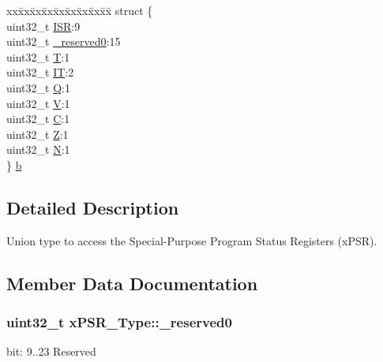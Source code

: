 \begin{DoxyCompactItemize}
\begin{tabbing}
\end{tabbing}\item 
\begin{tabbing}
xx\=xx\=xx\=xx\=xx\=xx\=xx\=xx\=xx\=\kill
struct \{\\
\>uint32\_t \hyperlink{unionxPSR__Type_a3e9120dcf1a829fc8d2302b4d0673970}{ISR}:9\\
\>uint32\_t \hyperlink{unionxPSR__Type_af438e0f407357e914a70b5bd4d6a97c5}{\_reserved0}:15\\
\>uint32\_t \hyperlink{unionxPSR__Type_a7eed9fe24ae8d354cd76ae1c1110a658}{T}:1\\
\>uint32\_t \hyperlink{unionxPSR__Type_a3200966922a194d84425e2807a7f1328}{IT}:2\\
\>uint32\_t \hyperlink{unionxPSR__Type_add7cbd2b0abd8954d62cd7831796ac7c}{Q}:1\\
\>uint32\_t \hyperlink{unionxPSR__Type_af14df16ea0690070c45b95f2116b7a0a}{V}:1\\
\>uint32\_t \hyperlink{unionxPSR__Type_a40213a6b5620410cac83b0d89564609d}{C}:1\\
\>uint32\_t \hyperlink{unionxPSR__Type_a1e5d9801013d5146f2e02d9b7b3da562}{Z}:1\\
\>uint32\_t \hyperlink{unionxPSR__Type_a2db9a52f6d42809627d1a7a607c5dbc5}{N}:1\\
\} \hyperlink{unionxPSR__Type_ad71fd533922cd07ce4a8f8c4716b0116}{b}\\

\end{tabbing}\end{DoxyCompactItemize}


\subsection{Detailed Description}
Union type to access the Special-\/\+Purpose Program Status Registers (x\+P\+SR). 

\subsection{Member Data Documentation}
\subsubsection[{\texorpdfstring{\+\_\+reserved0}{_reserved0}}]{\setlength{\rightskip}{0pt plus 5cm}uint32\+\_\+t x\+P\+S\+R\+\_\+\+Type\+::\+\_\+reserved0}\hypertarget{unionxPSR__Type_af438e0f407357e914a70b5bd4d6a97c5}{}\label{unionxPSR__Type_af438e0f407357e914a70b5bd4d6a97c5}
bit\+: 9..23 Reserved

